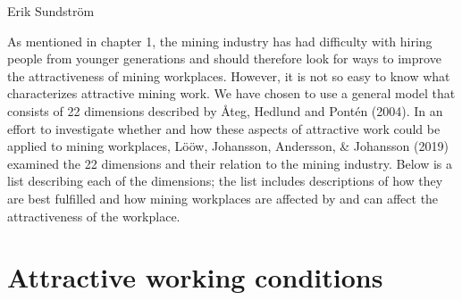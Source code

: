 \documentclass[
  12pt,
]{scrbook}
\newenvironment{chap-auth}
{\vspace{1cm}\begin{center}\begin{flushright}\sffamily\noindent}
  {\end{flushright}\end{center}\vspace{1cm}}
\begin{document}
\begin{chap-auth}
Erik Sundström
\end{chap-auth}

As mentioned in chapter 1, the mining industry has had difficulty with hiring people from younger generations and should therefore look for ways to improve the attractiveness of mining workplaces. However, it is not so easy to know what characterizes attractive mining work. We have chosen to use a general model that consists of 22 dimensions described by Åteg, Hedlund and Pontén (2004). In an effort to investigate whether and how these aspects of attractive work could be applied to mining workplaces, Lööw, Johansson, Andersson, \& Johansson (2019) examined the 22 dimensions and their relation to the mining industry. Below is a list describing each of the dimensions; the list includes descriptions of how they are best fulfilled and how mining workplaces are affected by and can affect the attractiveness of the workplace.

\hypertarget{attractive-working-conditions}{%
\section*{Attractive working conditions}\label{attractive-working-conditions}}
\end{document}
